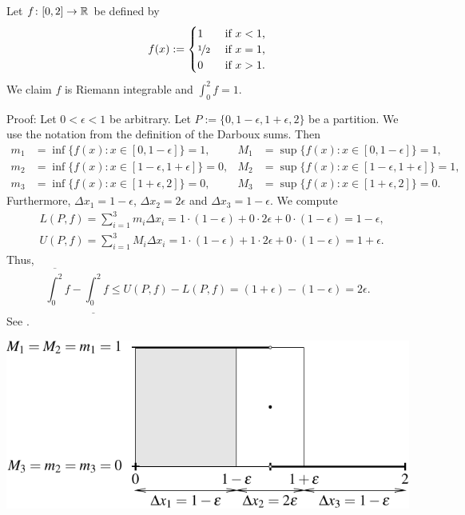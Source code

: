 \begin{example}
Let $f \colon [0,2] \to {\mathbb{R}}$ be defined by
\begin{equation*}
f(x) :=
\begin{cases}
1 & \text{ if $x < 1$,}\\
\nicefrac{1}{2} & \text{ if $x = 1$,}\\
0 & \text{ if $x > 1$.}
\end{cases}
\end{equation*}
We claim $f$ is Riemann integrable and $\int_0^2 f = 1$.

Proof: Let $0 < \epsilon < 1$ be arbitrary.
Let $P := \{0, 1-\epsilon, 1+\epsilon, 2\}$ be a partition.  We use the notation from
the definition of the Darboux sums.  Then
\begin{align*}
m_1 &= \inf \{ f(x) : x \in [0,1-\epsilon] \} = 1 , & 
M_1 &= \sup \{ f(x) : x \in [0,1-\epsilon] \} = 1 , \\
m_2 &= \inf \{ f(x) : x \in [1-\epsilon,1+\epsilon] \} = 0 , & 
M_2 &= \sup \{ f(x) : x \in [1-\epsilon,1+\epsilon] \} = 1 , \\
m_3 &= \inf \{ f(x) : x \in [1+\epsilon,2] \} = 0 , & 
M_3 &= \sup \{ f(x) : x \in [1+\epsilon,2] \} = 0 .
\end{align*}
Furthermore, $\Delta x_1 = 1-\epsilon$, $\Delta x_2 = 2\epsilon$ and
$\Delta x_3 = 1-\epsilon$.
We compute
\begin{align*}
& L(P,f) = \sum_{i=1}^3 m_i \Delta x_i =
1 \cdot (1-\epsilon) + 0 \cdot 2\epsilon + 0 \cdot (1-\epsilon)
= 1-\epsilon , \\
& U(P,f) = \sum_{i=1}^3 M_i \Delta x_i =
1 \cdot (1-\epsilon) + 1 \cdot 2\epsilon + 0 \cdot (1-\epsilon)
= 1+\epsilon .
\end{align*}
Thus,
\begin{equation*}
\overline{\int_0^2} f - 
\underline{\int_0^2} f
\leq
U(P,f) - L(P,f)
=
(1+\epsilon)
- (1-\epsilon) = 2 \epsilon .
\end{equation*}
See .
\begin{myfigureht}
\includegraphics{figures/darbouxfigstep}

\end{myfigureht}
\end{example}
